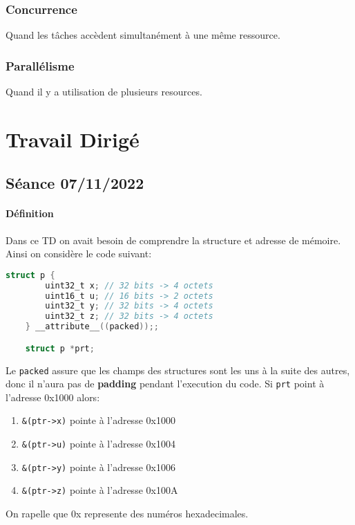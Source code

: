 \documentclass{article}
\begin{document}
\subsubsection{Concurrence}
\begin{definition}\label{def:concurrence}
    Quand les tâches accèdent simultanément à une même ressource.
\end{definition}

\subsubsection{Parallélisme}
\begin{definition}\label{def:parallelisme}
    Quand il y a utilisation de plusieurs resources.
\end{definition}


\section{Travail Dirigé}
\subsection{Séance 07/11/2022}
\paragraph{Définition}Dans ce TD on avait besoin de comprendre la structure et adresse de mémoire. Ainsi on considère le code suivant:
\begin{scriptsize}\mycode
    \begin{lstlisting}[language=C]
    struct p {
        uint32_t x; // 32 bits -> 4 octets
        uint16_t u; // 16 bits -> 2 octets
        uint32_t y; // 32 bits -> 4 octets
        uint32_t z; // 32 bits -> 4 octets
    } __attribute__((packed));;

    struct p *prt;
    \end{lstlisting}
\end{scriptsize}
Le \texttt{packed} assure que les champs des structures sont les uns à la suite des autres, donc il n'aura pas de \textbf{padding} pendant l'execution du code. Si \texttt{prt} point à l'adresse 0x1000 alors:
\begin{enumerate}[noitemsep]
    \item \texttt{\&(ptr->x)} pointe à l'adresse 0x1000
    \item \texttt{\&(ptr->u)} pointe à l'adresse 0x1004
    \item \texttt{\&(ptr->y)} pointe à l'adresse 0x1006
    \item \texttt{\&(ptr->z)} pointe à l'adresse 0x100A
\end{enumerate}
On rapelle que 0x represente des numéros hexadecimales.
\end{document}

